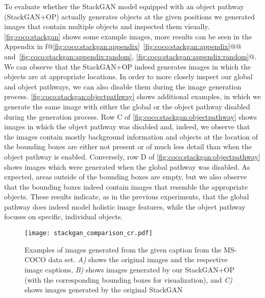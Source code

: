 \documentclass{article} \usepackage{iclr2019_conference,times}
\makeatletter
\newcommand\Autoref[1]{\@first@ref#1,@}
\def\@first@ref#1,#2{\ifx#2@\autoref{#1}\let\@nextref\@gobble \else \@set@refname{#1}\@refname~\ref{#1}\let\@nextref\@next@ref \fi \@nextref#2}
\def\@next@ref#1,#2{\ifx#2@ and~\ref{#1}\let\@nextref\@gobble \else, \ref{#1}\fi \@nextref#2}
\makeatother
\begin{document}
	To evaluate whether the StackGAN model equipped with an object pathway (StackGAN+OP) actually generates objects at the given positions we generated images that contain multiple objects and inspected them visually.
	\autoref{fig:coco:stackgan} shows some example images, more results can be seen in the Appendix in \Autoref{fig:coco:stackgan:appendix,fig:coco:stackgan:appendix:random}.
	We can observe that the StackGAN+OP indeed generates images in which the objects are at appropriate locations.
	In order to more closely inspect our global and object pathways, we can also disable them during the image generation process.
	\autoref{fig:coco:stackgan:objectpathway} shows additional examples, in which we generate the same image with either the global or the object pathway disabled during the generation process.
	Row C of \autoref{fig:coco:stackgan:objectpathway} shows images in which the object pathway was disabled and, indeed, we observe that the images contain mostly background information and objects at the location of the bounding boxes are either not present or of much less detail than when the object pathway is enabled.
	Conversely, row D of \autoref{fig:coco:stackgan:objectpathway} shows images which were generated when the global pathway was disabled.
	As expected, areas outside of the bounding boxes are empty, but we also observe that the bounding boxes indeed contain images that resemble the appropriate objects.
	These results indicate, as in the previous experiments, that the global pathway does indeed model holistic image features, while the object pathway focuses on specific, individual objects.
\begin{figure}[t]
		\centering
		\texttt{[image: stackgan\_comparison\_cr.pdf]}
		\caption[placeholder to enable footnotemark]{Examples of images generated from the given caption from the MS-COCO data set. \emph{A)} shows the original images and the respective image captions, \emph{B)} shows images generated by our StackGAN+OP (with the corresponding bounding boxes for visualization), and \emph{C)} shows images generated by the original StackGAN \citep{zhang2017stackgan}\footnotemark}
		\label{fig:coco:stackgan}
	\end{figure}
\end{document}
